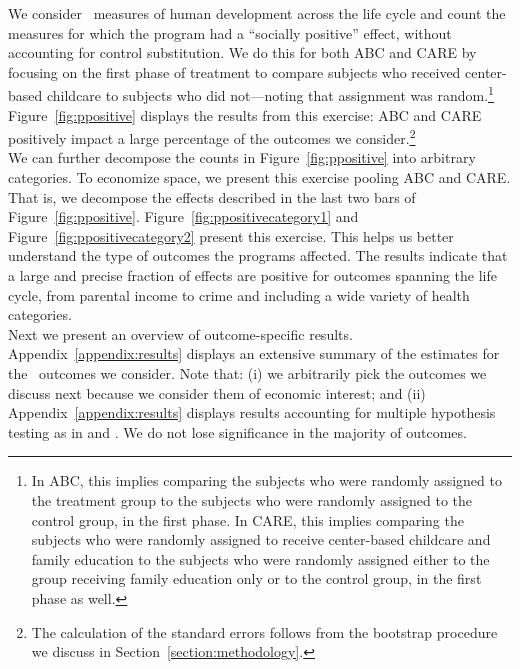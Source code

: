 \noindent We consider \noutcomes\ measures of human development across the life cycle and count the measures for which the program had a ``socially positive'' effect, without accounting for control substitution. We do this for both ABC and CARE by focusing on the first phase of treatment to compare subjects who received center-based childcare to subjects who did not---noting that assignment was random.\footnote{In ABC, this implies comparing the subjects who were randomly assigned to the treatment group to the subjects who were randomly assigned to the control group, in the first phase. In CARE, this implies comparing the subjects who were randomly assigned to receive center-based childcare and family education to the subjects who were randomly assigned either to the group receiving family education only or to the control group, in the first phase as well.} Figure~\ref{fig:ppositive} displays the results from this exercise: ABC and CARE positively impact a large percentage of the outcomes we consider.\footnote{The calculation of the standard errors follows from the bootstrap procedure we discuss in Section~\ref{section:methodology}.}\\ 

\noindent We can further decompose the counts in Figure~\ref{fig:ppositive} into arbitrary categories. To economize space, we present this exercise pooling ABC and CARE. That is, we decompose the effects described in the last two bars of Figure~\ref{fig:ppositive}. Figure~\ref{fig:ppositivecategory1} and Figure~\ref{fig:ppositivecategory2} present this exercise. This helps us better understand the type of outcomes the programs affected. The results indicate that a large and precise fraction of effects are positive for outcomes spanning the life cycle, from parental income to crime and including a wide variety of health categories.\\ 

\noindent Next we present an overview of outcome-specific results. Appendix~\ref{appendix:results} displays an extensive summary of the estimates for the \noutcomes\ outcomes we consider. Note that: (i) we arbitrarily pick the outcomes we discuss next because we consider them of economic interest; and (ii) Appendix~\ref{appendix:results} displays results accounting for multiple hypothesis testing as in \citet{Lehman_Romano_2005_AnnStat} and \citet{Romano_Shaikh_2006_AnnStat}. We do not lose significance in the majority of outcomes.

